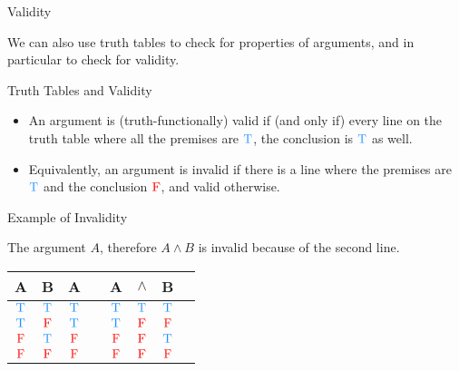 \documentclass[
  ignorenonframetext,
]{beamer}
\providecommand{\tightlist}{%
  \setlength{\itemsep}{0pt}\setlength{\parskip}{0pt}}
\renewcommand{\,}{\text{, }}
\def\True{\textcolor{dodgerblue}{\text{T}}}
\def\False{\textcolor{red}{\text{F}}}
\begin{document}
\begin{frame}{Validity}
\protect\hypertarget{validity}{}

We can also use truth tables to check for properties of arguments, and
in particular to check for validity.

\end{frame}

\begin{frame}{Truth Tables and Validity}
\protect\hypertarget{truth-tables-and-validity}{}

\begin{itemize}[<+->]
\tightlist
\item
  An argument is (truth-functionally) valid if (and only if) every line
  on the truth table where all the premises are \(\True\), the
  conclusion is \(\True\) as well.
\item
  Equivalently, an argument is invalid if there is a line where the
  premises are \(\True\) and the conclusion \(\False\), and valid
  otherwise.
\end{itemize}

\end{frame}

\begin{frame}{Example of Invalidity}
\protect\hypertarget{example-of-invalidity}{}

The argument \(A\), therefore \(A \wedge B\) is invalid because of the
second line.

\begin{center}
\bigskip
\begin{tabular}{@{ }c@{ }@{ }c | c | c@{ }@{ }c@{ }@{ }c@{ }@{ }c@{ }@{ }c}
A & B & A &  & A & $\wedge$ & B & \\
\hline 
$\True$ & $\True$ & \textcolor{red}{$\True$} &  & $\True$ & \textcolor{red}{$\True$} & $\True$ & \\
$\True$ & $\False$ & \textcolor{red}{$\True$} &  & $\True$ & \textcolor{red}{$\False$} & $\False$ & \\
$\False$ & $\True$ & \textcolor{red}{$\False$} &  & $\False$ & \textcolor{red}{$\False$} & $\True$ & \\
$\False$ & $\False$ & \textcolor{red}{$\False$} &  & $\False$ & \textcolor{red}{$\False$} & $\False$ & \\
\end{tabular}
\end{center}

\end{frame}
\end{document}
